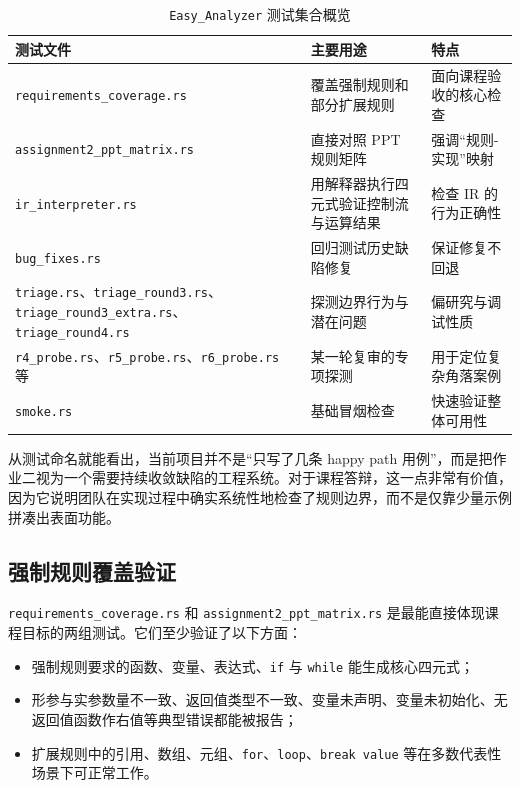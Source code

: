 \documentclass[UTF8,a4paper,12pt]{ctexart}
\newcommand{\pkg}[1]{\texttt{#1}}
\begin{document}
\begin{table}[H]
    \centering
    \caption{\pkg{Easy\_Analyzer} 测试集合概览}
    \label{tab:test-suites}
    \begin{tabularx}{\textwidth}{P{4.1cm}Y Y}
        \toprule
        测试文件 & 主要用途 & 特点 \\
        \midrule
        \pkg{requirements\_coverage.rs} & 覆盖强制规则和部分扩展规则 & 面向课程验收的核心检查 \\
        \pkg{assignment2\_ppt\_matrix.rs} & 直接对照 PPT 规则矩阵 & 强调“规则-实现”映射 \\
        \pkg{ir\_interpreter.rs} & 用解释器执行四元式验证控制流与运算结果 & 检查 IR 的行为正确性 \\
        \pkg{bug\_fixes.rs} & 回归测试历史缺陷修复 & 保证修复不回退 \\
        \pkg{triage.rs}、\pkg{triage\_round3.rs}、\pkg{triage\_round3\_extra.rs}、\pkg{triage\_round4.rs} & 探测边界行为与潜在问题 & 偏研究与调试性质 \\
        \pkg{r4\_probe.rs}、\pkg{r5\_probe.rs}、\pkg{r6\_probe.rs} 等 & 某一轮复审的专项探测 & 用于定位复杂角落案例 \\
        \pkg{smoke.rs} & 基础冒烟检查 & 快速验证整体可用性 \\
        \bottomrule
    \end{tabularx}
\end{table}

从测试命名就能看出，当前项目并不是“只写了几条 happy path 用例”，而是把作业二视为一个需要持续收敛缺陷的工程系统。对于课程答辩，这一点非常有价值，因为它说明团队在实现过程中确实系统性地检查了规则边界，而不是仅靠少量示例拼凑出表面功能。

\subsection{强制规则覆盖验证}

\pkg{requirements\_coverage.rs} 和 \pkg{assignment2\_ppt\_matrix.rs} 是最能直接体现课程目标的两组测试。它们至少验证了以下方面：

\begin{itemize}
    \item 强制规则要求的函数、变量、表达式、\pkg{if} 与 \pkg{while} 能生成核心四元式；
    \item 形参与实参数量不一致、返回值类型不一致、变量未声明、变量未初始化、无返回值函数作右值等典型错误都能被报告；
    \item 扩展规则中的引用、数组、元组、\pkg{for}、\pkg{loop}、\pkg{break value} 等在多数代表性场景下可正常工作。
\end{itemize}
\end{document}

